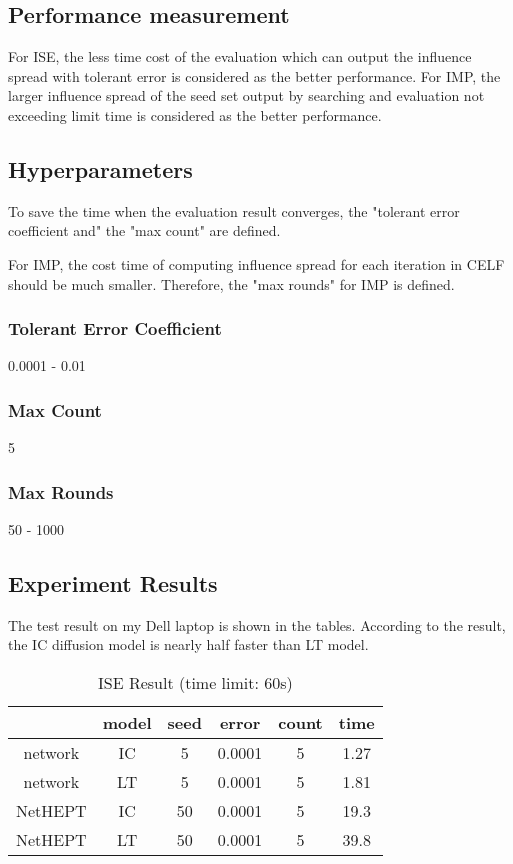 \documentclass[9pt,shortpaper,twoside,web]{ieeecolor}
\begin{document}
\subsection{Performance measurement}
For ISE, the less time cost of the evaluation which can output the influence spread with tolerant error is considered as the better performance. For IMP, the larger influence spread of the seed set output by searching and evaluation not exceeding limit time is considered as the better performance.

\subsection{Hyperparameters}
To save the time when the evaluation result converges, the "tolerant error coefficient and" the "max count" are defined.
\par
For IMP, the cost time of computing influence spread for each iteration in CELF should be much smaller. Therefore, the "max rounds" for IMP is defined.
\subsubsection{Tolerant Error Coefficient}0.0001 - 0.01
\subsubsection{Max Count}5
\subsubsection{Max Rounds}50 - 1000


\subsection{Experiment Results}
The test result on my Dell laptop is shown in the tables. According to the result, the IC diffusion model is nearly half faster than LT model. 
\begin{table}[ht]
\centering
\caption{ISE Result (time limit: 60s)}
\begin{tabular}{|c|c|c|c|c|c|}
\hline
 & model & seed & error & count & time \\ \hline
network & IC & 5 & 0.0001 & 5 & 1.27 \\ \hline
network & LT & 5 & 0.0001 & 5 & 1.81 \\ \hline
NetHEPT & IC & 50 & 0.0001 & 5 & 19.3 \\ \hline
NetHEPT & LT & 50 & 0.0001 & 5 & 39.8 \\ \hline
\end{tabular}
\end{table}
\end{document}
